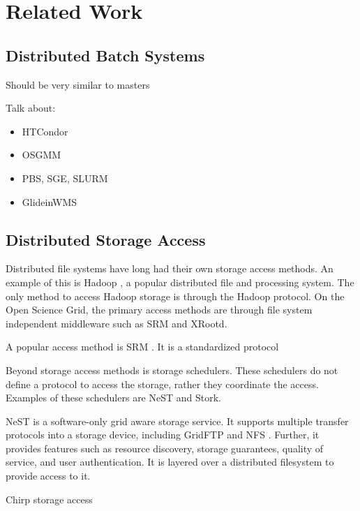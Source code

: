 \chapter{Related Work}
\label{chapter:relatedwork}

\section{Distributed Batch Systems}

Should be very similar to masters

Talk about:
\begin{itemize}
\item HTCondor
\item OSGMM
\item PBS, SGE, SLURM
\item GlideinWMS
\end{itemize}

\section{Distributed Storage Access}

Distributed file systems have long had their own storage access methods.  An example of this is Hadoop \cite{white2012hadoop}, a popular distributed file and processing system.  The only method to access Hadoop storage is through the Hadoop protocol.  On the Open Science Grid, the primary access methods are through file system independent middleware such as SRM and XRootd. 


A popular access method is SRM \cite{shoshani2002storage}.  It is a standardized protocol 

Beyond storage access methods is storage schedulers.  These schedulers do not define a protocol to access the storage, rather they coordinate the access.  Examples of these schedulers are NeST and Stork.

NeST \cite{bent2002flexibility} is a software-only grid aware storage service.  It supports multiple transfer protocols into a storage device, including GridFTP \cite{allcock2005globus} and NFS \cite{walsh1985overview}.  Further, it provides features such as resource discovery, storage guarantees, quality of service, and user authentication.  It is layered over a distributed filesystem to provide access to it.

Chirp storage access

